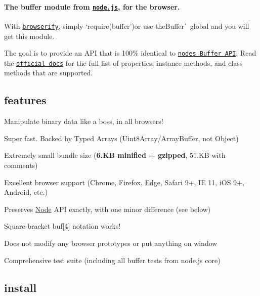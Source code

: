 \paragraph*{The buffer module from \href{https://nodejs.org/}{\tt node.\+js}, for the browser.}

\href{https://saucelabs.com/u/buffer}{\tt }

With \href{http://browserify.org}{\tt browserify}, simply `require(\textquotesingle{}buffer'){\ttfamily or use the}Buffer\`{} global and you will get this module.

The goal is to provide an A\+PI that is 100\% identical to \href{https://nodejs.org/api/buffer.html}{\tt node\textquotesingle{}s Buffer A\+PI}. Read the \href{https://nodejs.org/api/buffer.html}{\tt official docs} for the full list of properties, instance methods, and class methods that are supported.

\subsection*{features}


\begin{DoxyItemize}
\item Manipulate binary data like a boss, in all browsers!
\item Super fast. Backed by Typed Arrays ({\ttfamily Uint8\+Array}/{\ttfamily Array\+Buffer}, not {\ttfamily Object})
\item Extremely small bundle size ({\bfseries 6.\+KB minified + gzipped}, 51.\+KB with comments)
\item Excellent browser support (Chrome, Firefox, \mbox{\hyperlink{classEdge}{Edge}}, Safari 9+, IE 11, i\+OS 9+, Android, etc.)
\item Preserves \mbox{\hyperlink{classNode}{Node}} A\+PI exactly, with one minor difference (see below)
\item Square-\/bracket {\ttfamily buf\mbox{[}4\mbox{]}} notation works!
\item Does not modify any browser prototypes or put anything on {\ttfamily window}
\item Comprehensive test suite (including all buffer tests from node.\+js core)
\end{DoxyItemize}

\subsection*{install}

